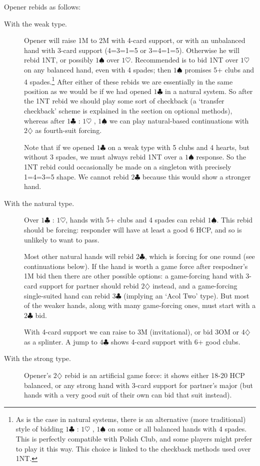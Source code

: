 \documentclass{article}
\newcommand{\sz}{\spadesuit}
\newcommand{\hz}{\heartsuit}
\newcommand{\dz}{\diamondsuit}
\newcommand{\cz}{\clubsuit}
\begin{document}
Opener rebids as follows:
\begin{description}
\item[With the weak type.] Opener will raise 1M to 2M with 4-card support, or with an unbalanced hand with 3-card support (4=3=1=5 or 3=4=1=5). Otherwise he will rebid 1NT, or possibly $1\sz$ over $1\hz$. Recommended is to bid 1NT over $1\hz$ on any balanced hand, even with 4 spades; then $1\sz$ promises 5+ clubs and 4 spades.\footnote{As is the case in natural systems, there is an alternative (more traditional) style of bidding $1\cz$ : $1\hz$ , $1\sz$ on some or all balanced hands with 4 spades. This is perfectly compatible with Polish Club, and some players might prefer to play it this way. This choice is linked to the checkback methods used over 1NT.} After either of these rebids we are essentially in the same position as we would be if we had opened $1\cz$ in a natural system. So after the 1NT rebid we should play some sort of checkback (a `transfer checkback' scheme is explained in the section on optional methods), whereas after $1\cz$ : $1\hz$ , $1\sz$ we can play natural-based continuations with $2\dz$ as fourth-suit forcing.

Note that if we opened $1\cz$ on a weak type with 5 clubs and 4 hearts, but without 3 spades, we must always rebid 1NT over a $1\sz$ response. So the 1NT rebid could occasionally be made on a singleton with precisely 1=4=3=5 shape. We cannot rebid $2\cz$ because this would show a stronger hand.

\item[With the natural type.] Over $1\cz$ : $1\hz$, hands with 5+ clubs and 4 spades can rebid $1\sz$. This rebid should be forcing: responder will have at least a good 6 HCP, and so is unlikely to want to pass.

Most other natural hands will rebid $2\cz$, which is forcing for one round (see continuations below). If the hand is worth a game force after respodner's 1M bid then there are other possible options: a game-forcing hand with 3-card support for partner should rebid $2\dz$ instead, and a game-forcing single-suited hand can rebid $3\cz$ (implying an `Acol Two' type). But most of the weaker hands, along with many game-forcing ones, must start with a $2\cz$ bid.

With 4-card support we can raise to 3M (invitational), or bid 3OM or $4\dz$ as a splinter. A jump to $4\cz$ shows 4-card support with 6+ good clubs.

\item[With the strong type.] Opener's $2\dz$ rebid is an artificial game force: it shows either 18-20 HCP balanced, or any strong hand with 3-card support for partner's major (but hands with a very good suit of their own can bid that suit instead).


\end{description}
\end{document}
